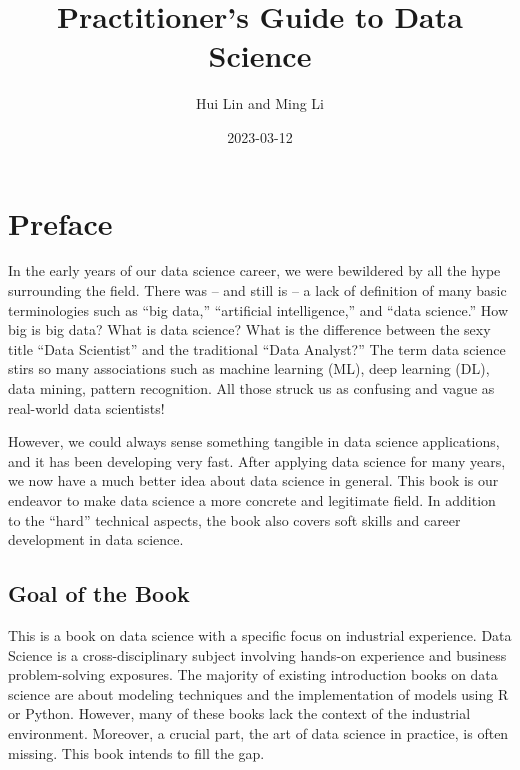 \documentclass[
  12pt,
]{krantz}
\title{Practitioner's Guide to Data Science}
\author{Hui Lin and Ming Li}
\date{2023-03-12}
\begin{document}
\maketitle

\thispagestyle{empty}
\begin{center}
\end{center}

\setlength{\abovedisplayskip}{-5pt}
\setlength{\abovedisplayshortskip}{-5pt}

{
\hypersetup{linkcolor=}
\setcounter{tocdepth}{2}
\tableofcontents
}
\listoffigures
\listoftables
\hypertarget{preface}{%
\chapter*{Preface}\label{preface}}


In the early years of our data science career, we were bewildered by all the hype surrounding the field. There was -- and still is -- a lack of definition of many basic terminologies such as ``big data,'' ``artificial intelligence,'' and ``data science.'' How big is big data? What is data science? What is the difference between the sexy title ``Data Scientist'' and the traditional ``Data Analyst?'' The term data science stirs so many associations such as machine learning (ML), deep learning (DL), data mining, pattern recognition. All those struck us as confusing and vague as real-world data scientists!

However, we could always sense something tangible in data science applications, and it has been developing very fast. After applying data science for many years, we now have a much better idea about data science in general. This book is our endeavor to make data science a more concrete and legitimate field. In addition to the ``hard'' technical aspects, the book also covers soft skills and career development in data science.

\hypertarget{goal-of-the-book}{%
\section*{Goal of the Book}\label{goal-of-the-book}}


This is a book on data science with a specific focus on industrial experience. Data Science is a cross-disciplinary subject involving hands-on experience and business problem-solving exposures. The majority of existing introduction books on data science are about modeling techniques and the implementation of models using R or Python. However, many of these books lack the context of the industrial environment. Moreover, a crucial part, the art of data science in practice, is often missing. This book intends to fill the gap.
\end{document}
